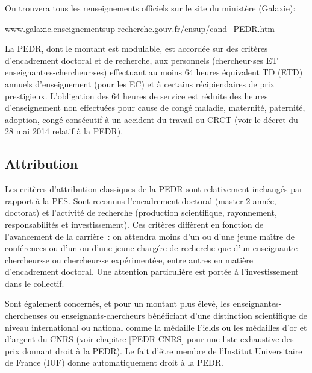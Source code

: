 On trouvera tous les renseignements officiels sur le site du minist\`ere (Galaxie):

\url{www.galaxie.enseignementsup-recherche.gouv.fr/ensup/cand\_PEDR.htm}


La PEDR, dont le montant est modulable, est accord\'ee sur des crit\`eres d'encadrement
doctoral et de recherche,  aux personnels (chercheur$\cdot$ses ET enseignant$\cdot$es-chercheur$\cdot$ses)
effectuant au moins 64 heures \'equivalent TD (ETD) annuels d'enseignement (pour les EC)
et \`a certains r\'ecipiendaires de prix prestigieux. L'obligation des 64 heures de service est r\'eduite des heures d'enseignement non effectu\'ees pour cause de cong\'e maladie, maternit\'e, paternit\'e, adoption, cong\'e cons\'ecutif \`a un accident du travail ou CRCT (voir le d\'ecret du 28 mai 2014 relatif \`a la PEDR).


\subsection{Attribution}

Les crit\`eres d'attribution classiques de la PEDR sont relativement inchang\'es par rapport \`a la PES.
Sont reconnus l'encadrement doctoral (master 2\ieme{} ann\'ee,
doctorat) et l'activit\'e de recherche (production scientifique, rayonnement, responsabilit\'es et investissement).
Ces crit\`eres diff\`erent en
fonction de l'avancement de la carri\`ere~: on attendra moins d'un ou d'une
jeune ma\^\i  tre de conf\'erences ou d'un ou d'une jeune charg\'e$\cdot$e de recherche que d'un enseignant$\cdot$e-chercheur$\cdot$se ou chercheur$\cdot$se
exp\'eriment\'e$\cdot$e, entre autres en mati\`ere d'encadrement
doctoral. Une attention particuli\`ere est port\'ee \`a l'investissement dans le collectif.

Sont \'egalement concern\'es, et pour un montant plus \'elev\'e, les enseignantes-chercheuses ou enseignants-chercheurs
b\'en\'eficiant d'une distinction scientifique de niveau international ou national comme la m\'edaille Fields ou
les m\'edailles d'or et d'argent du CNRS
(voir chapitre \ref{PEDR CNRS} pour une liste exhaustive des prix donnant droit \`a la PEDR). Le fait d'\^etre membre de l'Institut Universitaire de France (IUF) donne automatiquement droit \`a la PEDR.


